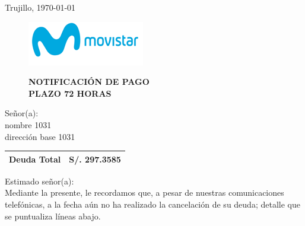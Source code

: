 %
%

\begin{flushright}
    Trujillo, \today
\end{flushright}
\vspace{-0.5cm}

\begin{figure}[h]
\begin{minipage}[b]{5.106458333cm}
\includegraphics[natwidth=5.106458333cm, natheight=1.931458333cm]{resources/business_logo.png}
\end{minipage}
\begin{minipage}[b][1.9314cm][t]{11cm}
\begin{flushright}
{\LARGE \bf NOTIFICACIÓN DE PAGO\\PLAZO 72 HORAS}
\end{flushright}
\end{minipage}
\end{figure}

\noindent
Señor(a):\\
nombre 1031\\
dirección base 1031

\begin{flushright}
\bf \large
\begin{tabular}{|p{3.2cm} p{3.2cm}|}
\hline
Deuda Total & S/. 297.3585 \\
\hline
\end{tabular}
\end{flushright}

\noindent
Estimado señor(a):\\
Mediante la presente, le recordamos que, a pesar de nuestras comunicaciones telefónicas, a la fecha aún no ha realizado la cancelación de su deuda; detalle que se puntualiza líneas abajo.


